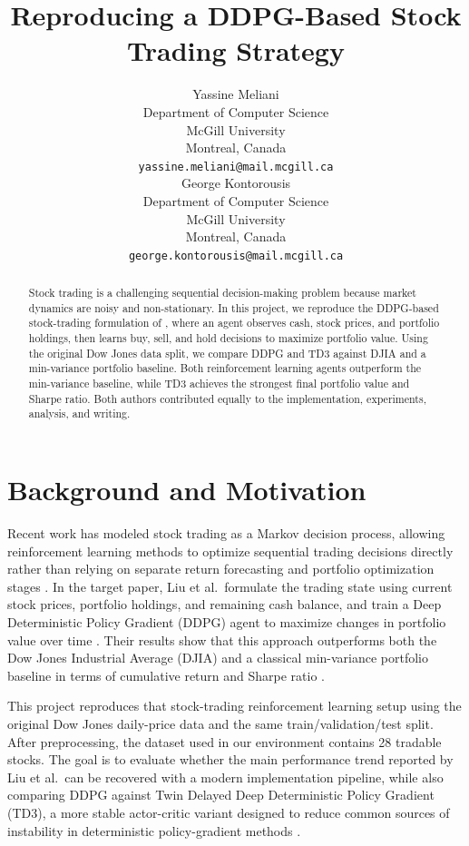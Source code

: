 \documentclass{article}
\title{Reproducing a DDPG-Based Stock Trading Strategy}
\author{%
  Yassine Meliani \\
  Department of Computer Science\\
  McGill University\\
  Montreal, Canada \\
  \texttt{yassine.meliani@mail.mcgill.ca} \\
  \And
  George Kontorousis \\
  Department of Computer Science\\
  McGill University\\
  Montreal, Canada \\
  \texttt{george.kontorousis@mail.mcgill.ca} \\
}
\begin{document}
\maketitle


\begin{abstract}
Stock trading is a challenging sequential decision-making problem because market dynamics are noisy and non-stationary. In this project, we reproduce the DDPG-based stock-trading formulation of \citet{liu2018practical}, where an agent observes cash, stock prices, and portfolio holdings, then learns buy, sell, and hold decisions to maximize portfolio value. Using the original Dow Jones data split, we compare DDPG and TD3 against DJIA and a min-variance portfolio baseline. Both reinforcement learning agents outperform the min-variance baseline, while TD3 achieves the strongest final portfolio value and Sharpe ratio. Both authors contributed equally to the implementation, experiments, analysis, and writing.
\end{abstract}



\section{Background and Motivation}

Recent work has modeled stock trading as a Markov decision process, allowing reinforcement learning methods to optimize sequential trading decisions directly rather than relying on separate return forecasting and portfolio optimization stages \cite{liu2018practical}. In the target paper, Liu et al.\ formulate the trading state using current stock prices, portfolio holdings, and remaining cash balance, and train a Deep Deterministic Policy Gradient (DDPG) agent to maximize changes in portfolio value over time \cite{liu2018practical}. Their results show that this approach outperforms both the Dow Jones Industrial Average (DJIA) and a classical min-variance portfolio baseline in terms of cumulative return and Sharpe ratio \cite{liu2018practical}.

This project reproduces that stock-trading reinforcement learning setup using the original Dow Jones daily-price data and the same train/validation/test split. After preprocessing, the dataset used in our environment contains 28 tradable stocks. The goal is to evaluate whether the main performance trend reported by Liu et al.\ can be recovered with a modern implementation pipeline, while also comparing DDPG against Twin Delayed Deep Deterministic Policy Gradient (TD3), a more stable actor-critic variant designed to reduce common sources of instability in deterministic policy-gradient methods \cite{fujimoto2018}.
\end{document}
